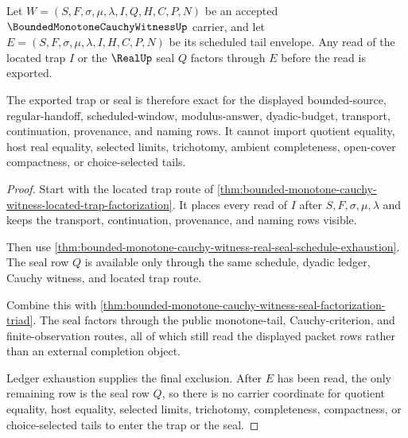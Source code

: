 \begin{theorem}
\label{thm:bounded-monotone-cauchy-witness-trap-seal-exactness}
Let $W=(S,F,\sigma,\mu,\lambda,I,Q,H,C,P,N)$ be an accepted $\BoundedMonotoneCauchyWitnessUp$ carrier, and let $E=(S,F,\sigma,\mu,\lambda,I,H,C,P,N)$ be its scheduled tail envelope. Any read of the located trap $I$ or the $\RealUp$ seal $Q$ factors through $E$ before the read is exported.

The exported trap or seal is therefore exact for the displayed bounded-source, regular-handoff, scheduled-window, modulus-answer, dyadic-budget, transport, continuation, provenance, and naming rows. It cannot import quotient equality, host real equality, selected limits, trichotomy, ambient completeness, open-cover compactness, or choice-selected tails.
\end{theorem}
\begin{proof}
Start with the located trap route of \autoref{thm:bounded-monotone-cauchy-witness-located-trap-factorization}. It places every read of $I$ after $S,F,\sigma,\mu,\lambda$ and keeps the transport, continuation, provenance, and naming rows visible.

Then use \autoref{thm:bounded-monotone-cauchy-witness-real-seal-schedule-exhaustion}. The seal row $Q$ is available only through the same schedule, dyadic ledger, Cauchy witness, and located trap route.

Combine this with \autoref{thm:bounded-monotone-cauchy-witness-seal-factorization-triad}. The seal factors through the public monotone-tail, Cauchy-criterion, and finite-observation routes, all of which still read the displayed packet rows rather than an external completion object.

Ledger exhaustion supplies the final exclusion. After $E$ has been read, the only remaining row is the seal row $Q$, so there is no carrier coordinate for quotient equality, host equality, selected limits, trichotomy, completeness, compactness, or choice-selected tails to enter the trap or the seal.
\end{proof}


